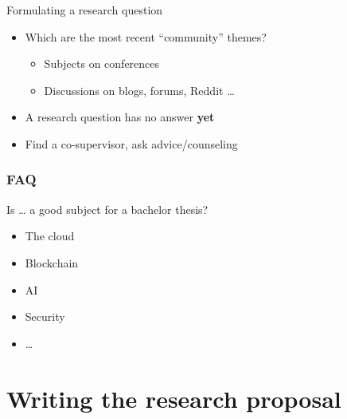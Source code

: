 \documentclass[aspectratio=169]{beamer}
\begin{document}
    \begin{frame}{Formulating a research question}
        
        \begin{itemize}
            \item Which are the most recent ``community'' themes?
            \begin{itemize}
                \item Subjects on conferences
                \item Discussions on blogs, forums, Reddit \ldots
            \end{itemize}
            \item A research question has no answer \textbf{yet} 
            \item Find a co-supervisor, ask advice/counseling
        \end{itemize}
        
    \end{frame}
    
    \begin{frame}[plain]
        \frametitle{FAQ}
        
        Is \ldots{} a good subject for a bachelor thesis?
        
        \begin{itemize}
            \item The cloud
            \item Blockchain
            \item AI
            \item Security
            \item \ldots
        \end{itemize}
        
        \bigskip
        
    \end{frame}
    
    \section{Writing the research proposal}
    
\end{document}
